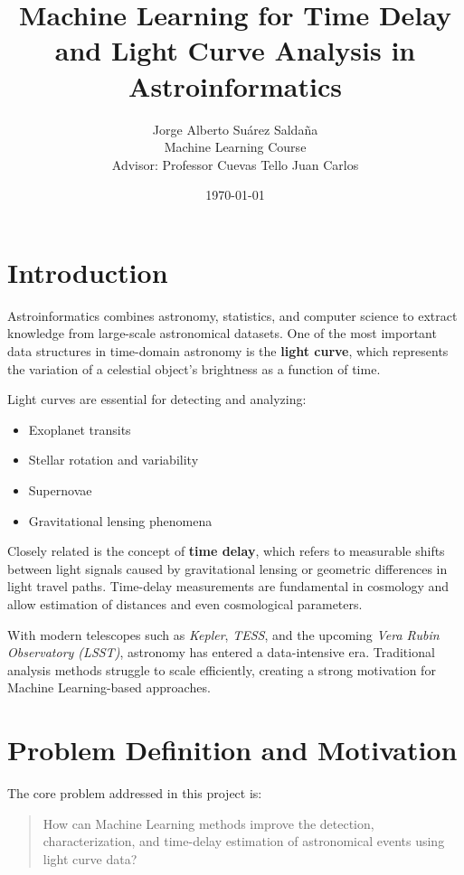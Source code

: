 \documentclass[12pt]{article}
\title{\textbf{Machine Learning for Time Delay and Light Curve Analysis in Astroinformatics}}
\author{Jorge Alberto Suárez Saldaña \\
Machine Learning Course \\
Advisor: Professor Cuevas Tello Juan Carlos}
\date{\today}
\begin{document}
\maketitle
\newpage

\section{Introduction}

Astroinformatics combines astronomy, statistics, and computer science to extract knowledge from large-scale astronomical datasets. One of the most important data structures in time-domain astronomy is the \textbf{light curve}, which represents the variation of a celestial object's brightness as a function of time.

Light curves are essential for detecting and analyzing:
\begin{itemize}
    \item Exoplanet transits
    \item Stellar rotation and variability
    \item Supernovae
    \item Gravitational lensing phenomena
\end{itemize}

Closely related is the concept of \textbf{time delay}, which refers to measurable shifts between light signals caused by gravitational lensing or geometric differences in light travel paths. Time-delay measurements are fundamental in cosmology and allow estimation of distances and even cosmological parameters.

With modern telescopes such as \textit{Kepler}, \textit{TESS}, and the upcoming \textit{Vera Rubin Observatory (LSST)}, astronomy has entered a data-intensive era. Traditional analysis methods struggle to scale efficiently, creating a strong motivation for Machine Learning-based approaches.

\section{Problem Definition and Motivation}

The core problem addressed in this project is:

\begin{quote}
How can Machine Learning methods improve the detection, characterization, and time-delay estimation of astronomical events using light curve data?
\end{quote}
\end{document}
